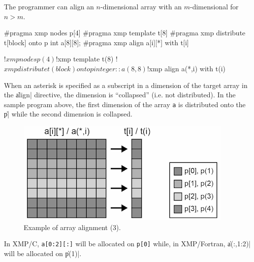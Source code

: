 

The programmer can align an $n$-dimensional array with an $m$-dimensional
{\template} for $n > m$.

\begin{XCexample}
#pragma xmp nodes p[4]
#pragma xmp template t[8]
#pragma xmp distribute t[block] onto p
int a[8][8];
#pragma xmp align a[i][*] with t[i]
\end{XCexample}

\begin{XFexample}
!$xmp nodes p(4)
!$xmp template t(8)
!$xmp distribute t(block) onto p
integer :: a(8,8)
!$xmp align a(*,i) with t(i)
\end{XFexample}

When an asterisk is specified as a subscript in a dimension of the
target array in the \|align| directive, the dimension is ``collapsed''
(i.e. not distributed). In the sample program above, the first dimension of the
array {\tt a} is distributed onto the {\narray} \|p| while the second
dimension is collapsed.

\begin{figure}
  \centering
  \includegraphics[width=0.9\columnwidth]{figs/collapse.png}
  \caption{Example of array alignment (3).}
\end{figure}

In XMP/C, {\tt a[0:2][:]} will be allocated on {\tt p[0]} while, in
XMP/Fortran, \|a(:,1:2)| will be allocated on \|p(1)|.


